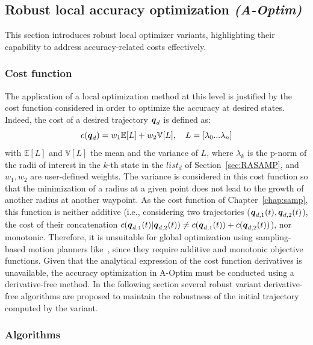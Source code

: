 \subsection{Robust local accuracy optimization \emph{(A-Optim)} }\label{sec:AOptim}

This section introduces robust local optimizer variants, highlighting their capability to address accuracy-related costs effectively.

\subsubsection{Cost function}\label{sec:AOptimCost}

The application of a local optimization method at this level is justified by the cost function considered in order to optimize the accuracy at desired states. 
Indeed, the cost of a desired trajectory $\boldsymbol{q}_d$ is defined as:
\begin{equation}\label{eq: cost}
    c(\boldsymbol{q}_d) = w_1\mathbb{E}[L] + w_2\mathbb{V}[L], \quad L = \left[\lambda_{0} ... \lambda_n \right]
\end{equation}
with $\mathbb{E}[L]$ and $\mathbb{V}[L]$ the mean and the variance of $L$, where $\lambda_k$ is the p-norm of the radii of interest in the $k$-th state in the $list_{d}$ of Section~\ref{sec:RASAMP}, and $w_1, w_2$ are user-defined weights.
The variance is considered in this cost function so that the minimization of a radius at a given point does not lead to the growth of another radius at another waypoint.
As the cost function of Chapter~\ref{chap:samp}, this function is neither additive (i.e., considering two trajectories ($\boldsymbol{q}_{d,1}(t), \boldsymbol{q}_{d,2}(t)$), the cost of their concatenation $c(\boldsymbol{q}_{d,1}(t)|\boldsymbol{q}_{d,2}(t)) \neq c(\boldsymbol{q}_{d,1}(t)) + c(\boldsymbol{q}_{d,2}(t))$), nor monotonic. 
Therefore, it is unsuitable for global optimization using sampling-based motion planners like~\cite{cRRT,cRRTstar}, since they require additive and monotonic objective functions.
Given that the analytical expression of the cost function derivatives is unavailable, the accuracy optimization in A-Optim must be conducted using a derivative-free method.
In the following section several robust variant derivative-free algorithms are proposed to maintain the robustness of the initial trajectory computed by the  variant.

\subsubsection{Algorithms}


